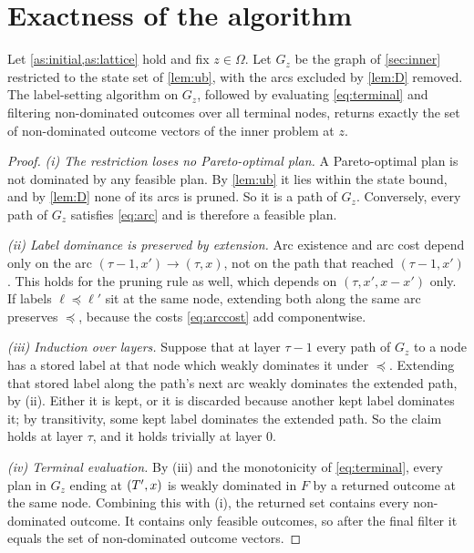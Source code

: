 \section{Exactness of the algorithm}\label{sec:exact}

\begin{theorem}\label{thm:exact}
  Let \cref{as:initial,as:lattice} hold and fix $z\in\Omega$. Let $G_z$ be the graph of
  \cref{sec:inner} restricted to the state set of \cref{lem:ub}, with the arcs excluded by
  \cref{lem:D} removed. The label-setting algorithm on $G_z$, followed by evaluating
  \eqref{eq:terminal} and filtering non-dominated outcomes over all terminal nodes,
  returns exactly the set of non-dominated outcome vectors of the inner problem at $z$.
\end{theorem}

\begin{proof}
  \emph{(i) The restriction loses no Pareto-optimal plan.} A Pareto-optimal plan is not
  dominated by any feasible plan. By \cref{lem:ub} it lies within the state bound, and by
  \cref{lem:D} none of its arcs is pruned. So it is a path of $G_z$. Conversely, every
  path of $G_z$ satisfies \eqref{eq:arc} and is therefore a feasible plan.

  \emph{(ii) Label dominance is preserved by extension.} Arc existence and arc cost
  depend only on the arc $(\tau-1,x')\to(\tau,x)$, not on the path that reached
  $(\tau-1,x')$. This holds for the pruning rule as well, which depends on
  $(\tau,x',x-x')$ only. If labels $\ell\preceq\ell'$ sit at the same node, extending both
  along the same arc preserves $\preceq$, because the costs \eqref{eq:arccost} add
  componentwise.

  \emph{(iii) Induction over layers.} Suppose that at layer $\tau-1$ every path of $G_z$
  to a node has a stored label at that node which weakly dominates it under $\preceq$.
  Extending that stored label along the path's next arc weakly dominates the extended
  path, by (ii). Either it is kept, or it is discarded because another kept label
  dominates it; by transitivity, some kept label dominates the extended path. So the claim
  holds at layer $\tau$, and it holds trivially at layer $0$.

  \emph{(iv) Terminal evaluation.} By (iii) and the monotonicity of \eqref{eq:terminal},
  every plan in $G_z$ ending at $(T',x)$ is weakly dominated in $F$ by a returned outcome
  at the same node. Combining this with (i), the returned set contains every
  non-dominated outcome. It contains only feasible outcomes, so after the final filter it
  equals the set of non-dominated outcome vectors.
\end{proof}

